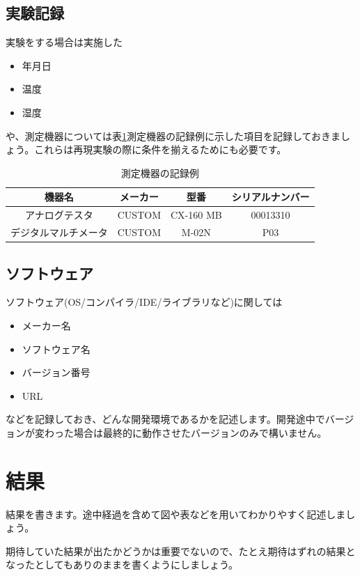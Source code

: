 \documentclass[dvipdfmx, a4paper]{jsarticle}
\begin{document}
\subsection{実験記録}
実験をする場合は実施した
\begin{itemize}
    \item 年月日
    \item 温度
    \item 湿度
\end{itemize}
や、測定機器については表\ref{tab:label_measure_table}測定機器の記録例に示した項目を記録しておきましょう。これらは再現実験の際に条件を揃えるためにも必要です。
\begin{table}[htbp]
    \centering
    \caption{測定機器の記録例}
    \label{tab:label_measure_table}
    \begin{tabular}{c|c|c|c} \hline
        機器名 & メーカー & 型番 & シリアルナンバー \\ \hline \hline
        アナログテスタ & CUSTOM & CX-160 MB & 00013310 \\ \hline
        デジタルマルチメータ & CUSTOM & M-02N & P03 \\ \hline
    \end{tabular}
\end{table}

\subsection{ソフトウェア}
ソフトウェア(OS/コンパイラ/IDE/ライブラリなど)に関しては
\begin{itemize}
    \item メーカー名
    \item ソフトウェア名
    \item バージョン番号
    \item URL
\end{itemize}

などを記録しておき、どんな開発環境であるかを記述します。開発途中でバージョンが変わった場合は最終的に動作させたバージョンのみで構いません。

\section{結果}
結果を書きます。途中経過を含めて図や表などを用いてわかりやすく記述しましょう。

期待していた結果が出たかどうかは重要でないので、たとえ期待はずれの結果となったとしてもありのままを書くようにしましょう。
\end{document}
